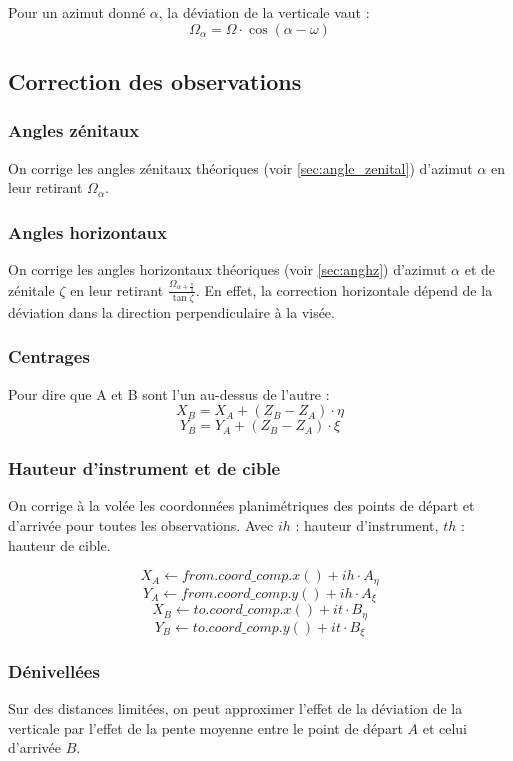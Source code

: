 \documentclass[french]{report}
\begin{document}
Pour un azimut donné $\alpha$, la déviation de la verticale vaut :
$$ \Omega_\alpha = \Omega \cdot \cos(\alpha - \omega) $$

\subsection{Correction des observations}
\subsubsection{Angles zénitaux}
On corrige les angles zénitaux théoriques (voir \ref{sec:angle_zenital}) d'azimut $\alpha$ en leur retirant $ \Omega_\alpha$.

\subsubsection{Angles horizontaux}
On corrige les angles horizontaux théoriques (voir \ref{sec:anghz}) d'azimut $\alpha$ et de zénitale $\zeta$ en leur retirant $ \frac{\Omega_{\alpha + \frac{\pi}{2}}}{\tan{\zeta}} $. En effet, la correction horizontale dépend de la déviation dans la direction perpendiculaire à la visée.

\subsubsection{Centrages}
Pour dire que A et B sont l'un au-dessus de l'autre :
$$ X_B = X_A + (Z_B-Z_A) \cdot \eta $$
$$ Y_B = Y_A + (Z_B-Z_A) \cdot \xi $$

\subsubsection{Hauteur d'instrument et de cible}
On corrige à la volée les coordonnées planimétriques des points de départ et d'arrivée pour toutes les observations. Avec $ih$ : hauteur d'instrument, $th$ : hauteur de cible.

$$X_A \leftarrow from.coord\_comp.x() + ih \cdot A_\eta$$
$$Y_A \leftarrow from.coord\_comp.y() + ih \cdot A_\xi$$
$$X_B \leftarrow to.coord\_comp.x() + it \cdot B_\eta$$
$$Y_B \leftarrow to.coord\_comp.y() + it \cdot B_\xi$$

\subsubsection{Dénivellées}
Sur des distances limitées, on peut approximer l'effet de la déviation de la verticale par l'effet de la pente moyenne entre le point de départ $A$ et celui d'arrivée $B$.
\end{document}
